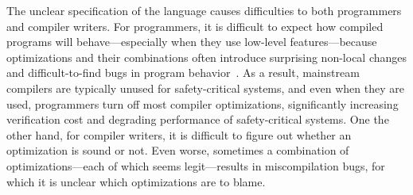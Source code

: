 The unclear specification of the language causes difficulties to both programmers and compiler
writers.  For programmers, it is difficult to expect how compiled programs will behave---especially
when they use low-level features---because optimizations and their combinations often introduce
surprising non-local changes and difficult-to-find bugs in program
behavior~\cite{wang2013towards,yang2011finding}.  As a result, mainstream compilers are typically
unused for safety-critical systems, and even when they are used, programmers turn off most compiler
optimizations, significantly increasing verification cost and degrading performance of
safety-critical systems.  One the other hand, for compiler writers, it is difficult to figure out
whether an optimization is sound or not.  Even worse, sometimes a combination of
optimizations---each of which seems legit---results in miscompilation bugs, for which it is unclear
which optimizations are to blame.







